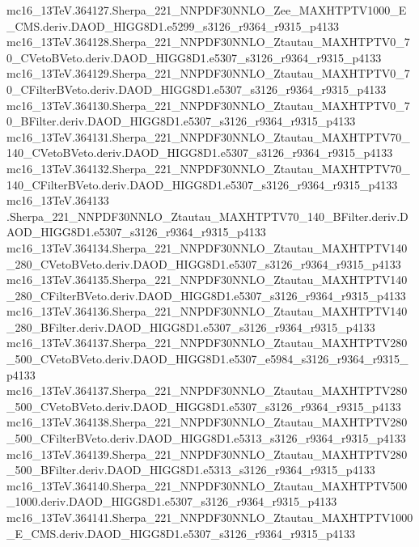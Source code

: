 mc16_13TeV.364127.Sherpa_221_NNPDF30NNLO_Zee_MAXHTPTV1000_E_CMS.deriv.DAOD_HIGG8D1.e5299_s3126_r9364_r9315_p4133 \\
mc16_13TeV.364128.Sherpa_221_NNPDF30NNLO_Ztautau_MAXHTPTV0_70_CVetoBVeto.deriv.DAOD_HIGG8D1.e5307_s3126_r9364_r9315_p4133 \\
mc16_13TeV.364129.Sherpa_221_NNPDF30NNLO_Ztautau_MAXHTPTV0_70_CFilterBVeto.deriv.DAOD_HIGG8D1.e5307_s3126_r9364_r9315_p4133 \\
mc16_13TeV.364130.Sherpa_221_NNPDF30NNLO_Ztautau_MAXHTPTV0_70_BFilter.deriv.DAOD_HIGG8D1.e5307_s3126_r9364_r9315_p4133 \\
mc16_13TeV.364131.Sherpa_221_NNPDF30NNLO_Ztautau_MAXHTPTV70_140_CVetoBVeto.deriv.DAOD_HIGG8D1.e5307_s3126_r9364_r9315_p4133 \\
mc16_13TeV.364132.Sherpa_221_NNPDF30NNLO_Ztautau_MAXHTPTV70_140_CFilterBVeto.deriv.DAOD_HIGG8D1.e5307_s3126_r9364_r9315_p4133 \\
mc16_13TeV.364133 \\.Sherpa_221_NNPDF30NNLO_Ztautau_MAXHTPTV70_140_BFilter.deriv.DAOD_HIGG8D1.e5307_s3126_r9364_r9315_p4133 \\
mc16_13TeV.364134.Sherpa_221_NNPDF30NNLO_Ztautau_MAXHTPTV140_280_CVetoBVeto.deriv.DAOD_HIGG8D1.e5307_s3126_r9364_r9315_p4133 \\
mc16_13TeV.364135.Sherpa_221_NNPDF30NNLO_Ztautau_MAXHTPTV140_280_CFilterBVeto.deriv.DAOD_HIGG8D1.e5307_s3126_r9364_r9315_p4133 \\
mc16_13TeV.364136.Sherpa_221_NNPDF30NNLO_Ztautau_MAXHTPTV140_280_BFilter.deriv.DAOD_HIGG8D1.e5307_s3126_r9364_r9315_p4133 \\
mc16_13TeV.364137.Sherpa_221_NNPDF30NNLO_Ztautau_MAXHTPTV280_500_CVetoBVeto.deriv.DAOD_HIGG8D1.e5307_e5984_s3126_r9364_r9315_p4133 \\
mc16_13TeV.364137.Sherpa_221_NNPDF30NNLO_Ztautau_MAXHTPTV280_500_CVetoBVeto.deriv.DAOD_HIGG8D1.e5307_s3126_r9364_r9315_p4133 \\
mc16_13TeV.364138.Sherpa_221_NNPDF30NNLO_Ztautau_MAXHTPTV280_500_CFilterBVeto.deriv.DAOD_HIGG8D1.e5313_s3126_r9364_r9315_p4133 \\
mc16_13TeV.364139.Sherpa_221_NNPDF30NNLO_Ztautau_MAXHTPTV280_500_BFilter.deriv.DAOD_HIGG8D1.e5313_s3126_r9364_r9315_p4133 \\
mc16_13TeV.364140.Sherpa_221_NNPDF30NNLO_Ztautau_MAXHTPTV500_1000.deriv.DAOD_HIGG8D1.e5307_s3126_r9364_r9315_p4133 \\
mc16_13TeV.364141.Sherpa_221_NNPDF30NNLO_Ztautau_MAXHTPTV1000_E_CMS.deriv.DAOD_HIGG8D1.e5307_s3126_r9364_r9315_p4133 \\
